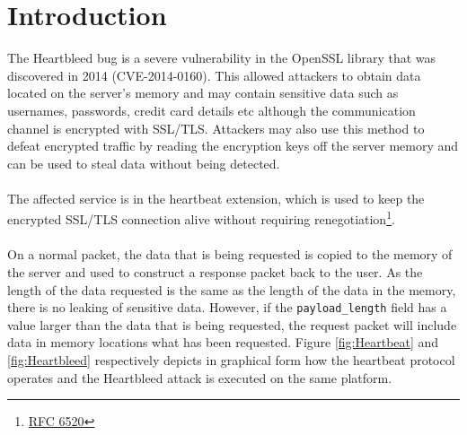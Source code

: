 \documentclass[a4paper,12pt]{article}
\begin{document}
	\newpage
	\setcounter{section}{0}
	\section{Introduction}
	The Heartbleed bug is a severe vulnerability in the OpenSSL library that was discovered in 2014 (CVE-2014-0160). This allowed attackers to obtain data located on the server's memory and may contain sensitive data such as usernames, passwords, credit card details etc although the communication channel is encrypted with SSL/TLS. Attackers may also use this method to defeat encrypted traffic by reading the encryption keys off the server memory and can be used to steal data without being detected.\\\\The affected service is in the heartbeat extension, which is used to keep the encrypted SSL/TLS connection alive without requiring renegotiation\footnote{\hyperlink{https://tools.ietf.org/html/rfc6520}{RFC 6520}}. \\\\On a normal packet, the data that is being requested is copied to the memory of the server and used to construct a response packet back to the user. As the length of the data requested is the same as the length of the data in the memory, there is no leaking of sensitive data. However, if the \texttt{payload\_length} field has a value larger than the data that is being requested, the request packet will include data in memory locations what has been requested. Figure
\ref{fig:Heartbeat} and \ref{fig:Heartbleed} respectively depicts in graphical form how the heartbeat protocol operates and the Heartbleed attack is executed on the same platform.
\end{document}
